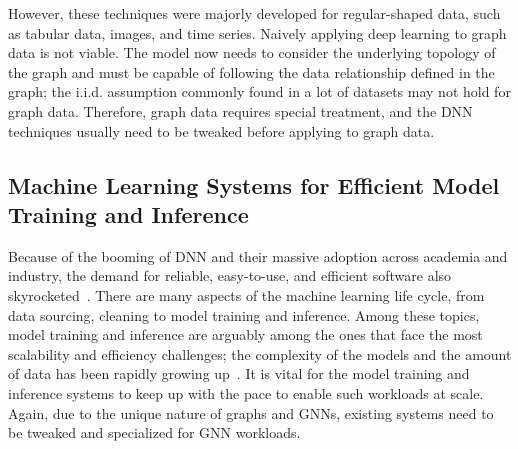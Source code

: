 However, these techniques were majorly developed for regular-shaped data, such as tabular data, images, and time series. Naively applying deep learning to graph data is not viable. The model now needs to consider the underlying topology of the graph and must be capable of following the data relationship defined in the graph; the i.i.d. assumption commonly found in a lot of datasets may not hold for graph data. Therefore, graph data requires special treatment, and the DNN techniques usually need to be tweaked before applying to graph data.
%


\subsection{Machine Learning Systems for Efficient Model Training and Inference}
Because of the booming of DNN and their massive adoption across academia and industry, the demand for reliable, easy-to-use, and efficient software also skyrocketed~\cite{tf, torch, spark}. There are many aspects of the machine learning life cycle, from data sourcing, cleaning to model training and inference. Among these topics, model training and inference are arguably among the ones that face the most scalability and efficiency challenges; the complexity of the models and the amount of data has been rapidly growing up~\cite{gpt-3, toi}. It is vital for the model training and inference systems to keep up with the pace to enable such workloads at scale.  Again, due to the unique nature of graphs and GNNs, existing systems need to be tweaked and specialized for GNN workloads.

